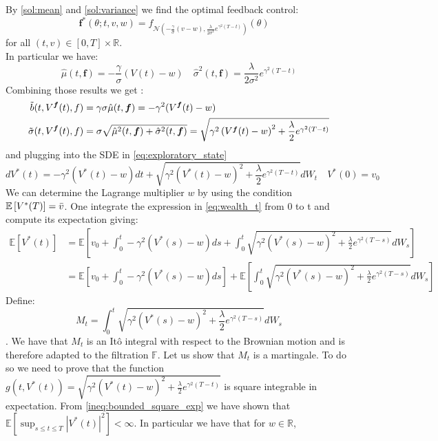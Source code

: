\documentclass[oneside, a4paper, onecolumn, 11pt]{article}
\begin{document}
By \eqref{sol:mean} and \eqref{sol:variance} we find the optimal feedback control:
\begin{equation}
\boldsymbol{f}^*(\theta;t,v,w) = f_{\mathcal{N}\left(- \frac{\gamma}{\sigma}(v-w), \frac{\lambda}{2\sigma^2} e^{\gamma^2(T-t)} \right)}(\theta) \quad 
\end{equation}
for all $(t,v) \in [0,T] \times \mathbb{R}$. \\ 
In particular we have:  
\begin{equation*}
  \hat{\mu}(t,\boldsymbol{f}) = - \frac{\gamma}{\sigma}(V(t)-w) \quad \hat{\sigma}^2(t,\boldsymbol{f}) =  \frac{\lambda}{2\sigma^2} e^{\gamma^2(T-t)} 
\end{equation*}
Combining those results we get :
\begin{align}
\Tilde{b}(t, V^{\boldsymbol{f}}(t), {f}) &= \gamma \sigma \hat{\mu}(t,\boldsymbol{f}) = -\gamma^2 (V^{\boldsymbol{f}}(t) - w)  \\ 
\Tilde{\sigma}(t, V^{\boldsymbol{f}}(t), {f}) &= \sigma \sqrt{\hat{\mu}^2(t,\boldsymbol{f}) + \hat{\sigma}^2(t,\boldsymbol{f})} = \sqrt{\gamma^2 \left(V^{\boldsymbol{f}}(t) - w\right)^2 + \frac{\lambda}{2}e^{\gamma^2(T-t)}}
\end{align}
and plugging into the SDE in \eqref{eq:exploratory_state}
\begin{equation}
dV^*(t) = -\gamma^2(V^*(t) - w)dt + \sqrt{\gamma^2 \left(V^*(t) - w\right)^2 + \frac{\lambda}{2}e^{\gamma^2(T-t)}}dW_t \quad V^*(0) = v_0 \label{eq:wealth_t}
\end{equation}
We can determine the Lagrange multiplier $w$ by using the condition $\mathbb{E}\left[V^*(T)\right] = \Bar{v}$. 
One integrate the expression in \eqref{eq:wealth_t} from 0 to t and compute its expectation giving: 
\begin{align*}
 \mathbb{E}\left[V^*(t)\right] &= \mathbb{E}\left[ v_0 + \int_{0}^{t}-\gamma^2(V^*(s) - w)ds + \int_{0}^{t}\sqrt{\gamma^2 \left(V^*(s) - w\right)^2 + \frac{\lambda}{2}e^{\gamma^2(T-s)}}dW_s\right] \\ 
 &= \mathbb{E}\left[v_0 + \int_{0}^{t}-\gamma^2(V^*(s) - w)ds \right] + \mathbb{E}\left[\int_{0}^{t}\sqrt{\gamma^2 \left(V^*(s) - w\right)^2 + \frac{\lambda}{2}e^{\gamma^2(T-s)}}dW_s\right]
\end{align*}
Define: $$M_t = \int_{0}^{t}\sqrt{\gamma^2 \left(V^*(s) - w\right)^2 + \frac{\lambda}{2}e^{\gamma^2(T-s)}}dW_s$$. We have that $M_t$ is an Itô integral with respect to the Brownian motion and is therefore adapted to the filtration $\mathbb{F}$. Let us show that $M_t$ is a martingale. To do so we need to prove that the function $g(t, V^*(t)) = \sqrt{\gamma^2 \left(V^*(t) - w\right)^2 + \frac{\lambda}{2}e^{\gamma^2(T-t)}}$ is square integrable in expectation. From \eqref{ineq:bounded_square_exp} we have shown that \\ $\mathbb{E}\left[ \sup_{s \leq t \leq T} \left|V^*(t)\right|^2 \right] < \infty $. In particular we have that for $w\in\mathbb{R}$,
\end{document}
